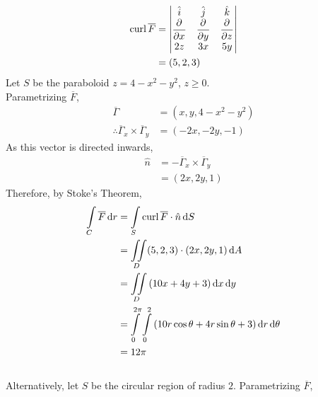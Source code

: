 \documentclass[fleqn, a4paper, 12pt, twoside]{article}
\theoremstyle{definition}
\theoremstyle{theorem}
\newcommand{\curl}{\mathrm{curl\,}}
\begin{document}
\begin{solution}
	\begin{align*}
		\curl \overline{F} &=
			\begin{vmatrix}
				\hat{i}   & \hat{j}   & \hat{k}   \\
				\dpd{}{x} & \dpd{}{y} & \dpd{}{z} \\
				2 z       & 3 x       & 5 y       \\
			\end{vmatrix}\\
		                   &= (5,2,3)
	\end{align*}
	Let $S$ be the paraboloid $z = 4 - x^2 - y^2$, $z \ge 0$.\\
	Parametrizing $\overline{F}$,
	\begin{align*}
		\overline{\Gamma}                                          & = \left( x , y , 4 - x^2 - y^2 \right) \\
		\therefore \overline{\Gamma}_x \times \overline{\Gamma}_y & = (-2 x , -2 y , -1)
	\end{align*}
	As this vector is directed inwards,
	\begin{align*}
		\hat{n} & = -\overline{\Gamma}_x \times \overline{\Gamma}_y \\
                        & = (2 x , 2 y , 1)
	\end{align*}
	Therefore, by Stoke's Theorem,
	\begin{align*}
		\int\limits_{C} \overline{F} \dif r & = \int\limits_{S} \curl \overline{F} \cdot \hat{n} \dif S                                                              \\
                                                    & = \iint\limits_{D} (5,2,3) \cdot (2 x , 2 y , 1) \dif A                                                                \\
                                                    & = \iint\limits_{D} \left( 10 x + 4 y + 3 \right) \dif x \dif y                                                         \\
                                                    & = \int\limits_{0}^{2 \pi} \int\limits_{0}^{2} \left( 10 r \cos \theta + 4 r \sin \theta + 3 \right) \dif r \dif \theta \\
                                                    & = 12 \pi
	\end{align*}
	~\\
	Alternatively, let $S$ be the circular region of radius $2$.
	Parametrizing $\overline{F}$,
	\begin{align*}

\end{align*}
\end{solution}
\end{document}
